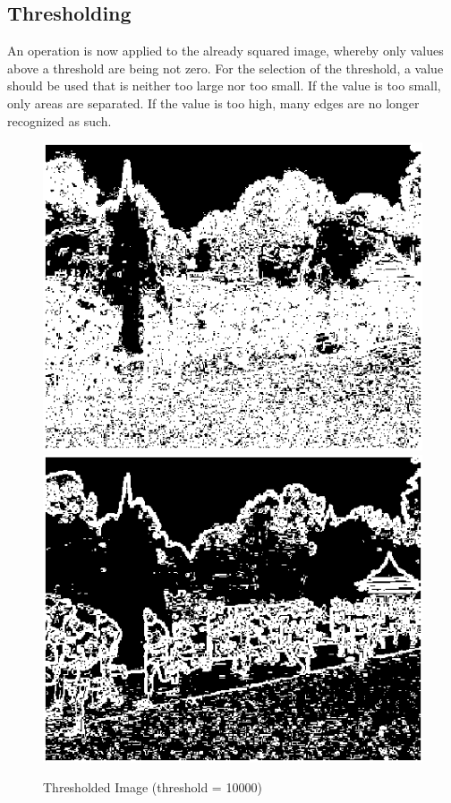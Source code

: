 \documentclass{article}
\begin{document}
	\subsection{Thresholding}
	An operation is now applied to the already squared image, whereby only values above a threshold are being not zero. 
	For the selection of the threshold, a value should be used that is neither too large nor too small. 
	If the value is too small, only areas are separated. If the value is too high, many edges are no longer recognized as such.
	\begin{figure}[!h]
		\center
		\caption{Thresholded Image (threshold = 10000)}
		\includegraphics[scale=0.5]{Et1000.png}
		\includegraphics[scale=0.5]{Et10000.png}

\end{figure}
\end{document}
